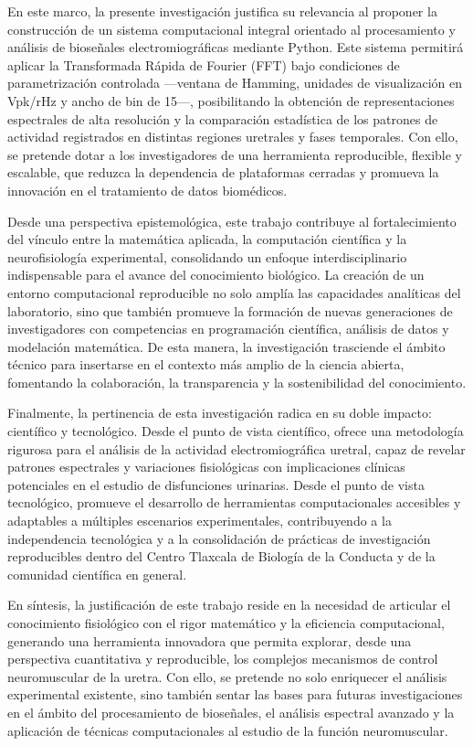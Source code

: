 \noindent En este marco, la presente investigación justifica su relevancia al proponer la construcción de un sistema computacional integral orientado al procesamiento y análisis de bioseñales electromiográficas mediante Python. Este sistema permitirá aplicar la Transformada Rápida de Fourier (FFT) bajo condiciones de parametrización controlada —ventana de Hamming, unidades de visualización en Vpk/rHz y ancho de bin de 15—, posibilitando la obtención de representaciones espectrales de alta resolución y la comparación estadística de los patrones de actividad registrados en distintas regiones uretrales y fases temporales. Con ello, se pretende dotar a los investigadores de una herramienta reproducible, flexible y escalable, que reduzca la dependencia de plataformas cerradas y promueva la innovación en el tratamiento de datos biomédicos.

\noindent Desde una perspectiva epistemológica, este trabajo contribuye al fortalecimiento del vínculo entre la matemática aplicada, la computación científica y la neurofisiología experimental, consolidando un enfoque interdisciplinario indispensable para el avance del conocimiento biológico. La creación de un entorno computacional reproducible no solo amplía las capacidades analíticas del laboratorio, sino que también promueve la formación de nuevas generaciones de investigadores con competencias en programación científica, análisis de datos y modelación matemática. De esta manera, la investigación trasciende el ámbito técnico para insertarse en el contexto más amplio de la ciencia abierta, fomentando la colaboración, la transparencia y la sostenibilidad del conocimiento.

\noindent Finalmente, la pertinencia de esta investigación radica en su doble impacto: científico y tecnológico. Desde el punto de vista científico, ofrece una metodología rigurosa para el análisis de la actividad electromiográfica uretral, capaz de revelar patrones espectrales y variaciones fisiológicas con implicaciones clínicas potenciales en el estudio de disfunciones urinarias. Desde el punto de vista tecnológico, promueve el desarrollo de herramientas computacionales accesibles y adaptables a múltiples escenarios experimentales, contribuyendo a la independencia tecnológica y a la consolidación de prácticas de investigación reproducibles dentro del Centro Tlaxcala de Biología de la Conducta y de la comunidad científica en general.

\noindent En síntesis, la justificación de este trabajo reside en la necesidad de articular el conocimiento fisiológico con el rigor matemático y la eficiencia computacional, generando una herramienta innovadora que permita explorar, desde una perspectiva cuantitativa y reproducible, los complejos mecanismos de control neuromuscular de la uretra. Con ello, se pretende no solo enriquecer el análisis experimental existente, sino también sentar las bases para futuras investigaciones en el ámbito del procesamiento de bioseñales, el análisis espectral avanzado y la aplicación de técnicas computacionales al estudio de la función neuromuscular.

